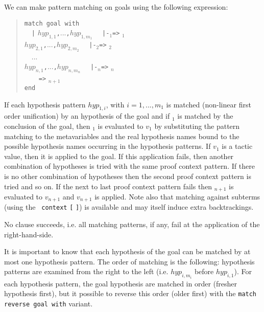 We can make pattern matching on goals using the following expression:
\begin{quote}
\begin{tabbing}
{\tt match goal with}\\
~~\={\tt |} $hyp_{1,1}${\tt ,}...{\tt ,}$hyp_{1,m_1}$
   ~~{\tt |-}{\cpattern}$_1${\tt =>} {\tacexpr}$_1$\\
  \>{\tt |} $hyp_{2,1}${\tt ,}...{\tt ,}$hyp_{2,m_2}$
   ~~{\tt |-}{\cpattern}$_2${\tt =>} {\tacexpr}$_2$\\
~~...\\
  \>{\tt |} $hyp_{n,1}${\tt ,}...{\tt ,}$hyp_{n,m_n}$
   ~~{\tt |-}{\cpattern}$_n${\tt =>} {\tacexpr}$_n$\\
  \>{\tt |\_}~~~~{\tt =>} {\tacexpr}$_{n+1}$\\
{\tt end}
\end{tabbing}
\end{quote}

If each hypothesis pattern $hyp_{1,i}$, with $i=1,...,m_1$
is matched (non-linear first order unification) by an hypothesis of
the goal and if {\cpattern}$_1$ is matched by the conclusion of the
goal, then {\tacexpr}$_1$ is evaluated to $v_1$ by substituting the
pattern matching to the metavariables and the real hypothesis names
bound to the possible hypothesis names occurring in the hypothesis
patterns. If $v_1$ is a tactic value, then it is applied to the
goal. If this application fails, then another combination of
hypotheses is tried with the same proof context pattern. If there is
no other combination of hypotheses then the second proof context
pattern is tried and so on. If the next to last proof context pattern
fails then {\tacexpr}$_{n+1}$ is evaluated to $v_{n+1}$ and $v_{n+1}$
is applied. Note also that matching against subterms (using the {\tt
context} {\ident} {\tt [} {\cpattern} {\tt ]}) is available and may
itself induce extra backtrackings.

\ErrMsg {}

No clause succeeds, i.e. all matching patterns, if any,
fail at the application of the right-hand-side.

\medskip

It is important to know that each hypothesis of the goal can be
matched by at most one hypothesis pattern. The order of matching is
the following: hypothesis patterns are examined from the right to the
left (i.e. $hyp_{i,m_i}$ before $hyp_{i,1}$). For each hypothesis
pattern, the goal hypothesis are matched in order (fresher hypothesis
first), but it possible to reverse this order (older first) with
the {\tt match reverse goal with} variant.

